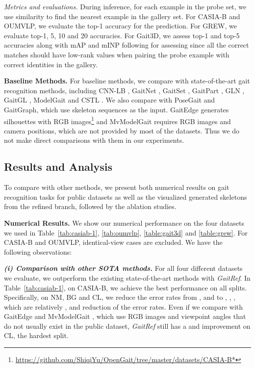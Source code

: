 \documentclass[10pt,twocolumn,letterpaper]{article}
\begin{document}
\textit{Metrics and evaluations.} During inference, for each example in the probe set, we use  similarity to find the nearest example in the gallery set. For CASIA-B and OUMVLP, we evaluate the top-1 accuracy for the prediction. For GREW, we evaluate top-1, 5, 10 and 20 accuracies. For Gait3D, we assess top-1 and top-5 accuracies along with mAP and mINP following \cite{ye2021deep} for assessing since all the correct matches should have low-rank values when pairing the probe example with correct identities in the gallery.


\textbf{Baseline Methods.} For baseline methods, we compare with state-of-the-art gait recognition methods, including CNN-LB \cite{wu2016comprehensive}, GaitNet \cite{song2019gaitnet}, GaitSet \cite{chao2019gaitset}, GaitPart \cite{fan2020gaitpart}, GLN \cite{hou2020gln}, GaitGL \cite{lin2021gaitgl}, ModelGait \cite{li2020end} and CSTL \cite{huang2021context}. We also compare with PoseGait \cite{liao2020model} and GaitGraph\cite{teepe2021gaitgraph}, which use skeleton sequences as the input. GaitEdge \cite{liang2022gaitedge} generates silhouettes with RGB images\footnote{\url{https://github.com/ShiqiYu/OpenGait/tree/master/datasets/CASIA-B*}} and MvModelGait \cite{li2021end} requires RGB images and camera positions, which are not provided by most of the datasets. Thus we do not make direct comparisons with them in our experiments.

\subsection{Results and Analysis}\label{sec:res}
To compare with other methods, we present both numerical results on gait recognition tasks for public datasets as well as the visualized generated skeletons from the refined branch, followed by the ablation studies.


\textbf{Numerical Results. }We show our numerical performance on the four datasets we used in Table~\ref{tab:casiab-1}, \ref{tab:oumvlp}, \ref{table:gait3d} and \ref{table:grew}. For CASIA-B and OUMVLP, identical-view cases are excluded. We have the following observations:


    
    \textbf{\textit{(i) Comparison with other SOTA methods.}} For all four different datasets we evaluate, we outperform the existing state-of-the-art methods with \textit{GaitRef}. In Table~\ref{tab:casiab-1}, on CASIA-B, we achieve the best performance on all splits. Specifically, on NM, BG and CL, we reduce the error rates from ,  and  to , , , which are relatively ,  and  reduction of the error rates. Even if we compare with GaitEdge \cite{liang2022gaitedge} and MvModelGait \cite{li2021end}, which use RGB images and viewpoint angles that do not usually exist in the public dataset, \textit{GaitRef} still has a  and  improvement on CL, the hardest split. 
    
\end{document}
